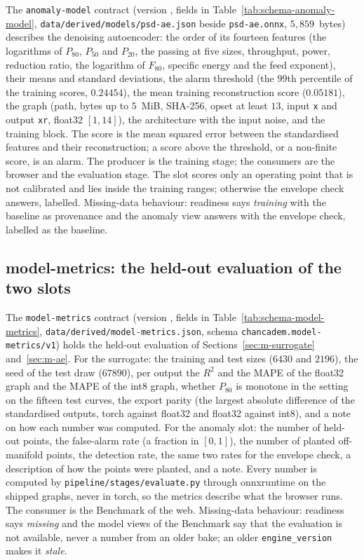 The \texttt{anomaly-model} contract (version , fields in Table~\ref{tab:schema-anomaly-model}, \texttt{data/\allowbreak{}derived/\allowbreak{}models/\allowbreak{}psd-ae.json} beside
\texttt{psd-ae.onnx}, $5{,}859$~bytes) describes the denoising autoencoder: the order of its fourteen features (the logarithms
of $P_{80}$, $P_{50}$ and $P_{20}$, the passing at five sizes, throughput, power, reduction ratio, the logarithm of $F_{80}$,
specific energy and the feed exponent), their means and standard deviations, the alarm threshold (the $99$th percentile of the
training scores, $0.24454$), the mean training reconstruction score ($0.05181$), the graph (path, bytes up to $5$~MiB, SHA-256,
opset at least $13$, input \texttt{x} and output \texttt{xr}, float32 $[1,14]$), the architecture with the input noise, and the
training block. The score is the mean squared error between the standardised features and their reconstruction; a score above the
threshold, or a non-finite score, is an alarm. The producer is the training stage; the consumers are the browser and the
evaluation stage. The slot scores only an operating point that is not calibrated and lies inside the training ranges; otherwise
the envelope check answers, labelled. Missing-data behaviour: readiness says \emph{training} with the baseline as provenance and
the anomaly view answers with the envelope check, labelled as the baseline.

\subsection{model-metrics: the held-out evaluation of the two slots}\label{sec:data-metrics}

The \texttt{model-metrics} contract (version , fields in Table~\ref{tab:schema-model-metrics}, \texttt{data/\allowbreak{}derived/\allowbreak{}model-metrics.json}, schema
\texttt{chancadem.model-metrics/\allowbreak{}v1}) holds the held-out evaluation of Sections~\ref{sec:m-surrogate} and~\ref{sec:m-ae}. For the
surrogate: the training and test sizes ($6430$ and $2196$), the seed of the test draw ($67890$), per output the $R^2$ and the MAPE
of the float32 graph and the MAPE of the int8 graph, whether $P_{80}$ is monotone in the setting on the fifteen test curves, the
export parity (the largest absolute difference of the standardised outputs, torch against float32 and float32 against int8), and a
note on how each number was computed. For the anomaly slot: the number of held-out points, the false-alarm rate (a fraction in
$[0,1]$), the number of planted off-manifold points, the detection rate, the same two rates for the envelope check, a description
of how the points were planted, and a note. Every number is computed by \texttt{pipeline/\allowbreak{}stages/\allowbreak{}evaluate.py} through onnxruntime
on the shipped graphs, never in torch, so the metrics describe what the browser runs. The consumer is the Benchmark of the web.
Missing-data behaviour: readiness says \emph{missing} and the model views of the Benchmark say that the evaluation is not
available, never a number from an older bake; an older \texttt{engine\_version} makes it \emph{stale}.

